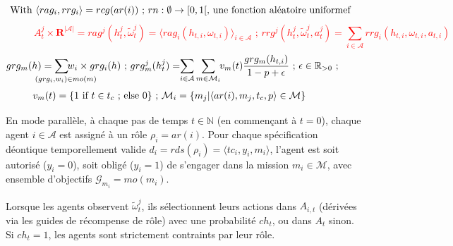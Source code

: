 \begin{figure}[h!]
\begin{scriptsize}
    \textcolor{red}{\[\hspace{-1cm}\text{ \hspace{-0.1cm} With } \langle rag_i, rrg_i \rangle = rcg(ar(i)) \text{ ; } rn: \emptyset \to [0,1[ \text{, une fonction aléatoire uniformef}\]}
    \vspace{-0.3cm}
    \textcolor{red}{\[A^j_t \times \mathbf{R}^{|\mathcal{A}|} = rag^j(h^j_t, \tilde{\omega}^j_t) = \langle rag_i(h_{t,i}, \omega_{t,i}) \rangle_{i \in \mathcal{A}} \text{ ; } rrg^j(h^j_t, \tilde{\omega}^j_t, a^j_t) = \sum_{i \in \mathcal{A}}{rrg_i(h_{t,i}, \omega_{t,i}, a_{t,i})}\]}
    \vspace{-0.75cm}
    \textcolor{blue}{
      \begin{gather*}
        \hspace{-1cm} grg_m(h) = \hspace{-1cm} \sum_{\hspace{0.3cm}(grg_i,w_i) \in mo(m)}{\hspace{-1.1cm} w_i \times grg_i(h)}
        \text{ ; }
        grg^j_m(h^j_t) = \hspace{-0.1cm} \sum_{i \in \mathcal{A}}{\sum_{m \in \mathcal{M}_i}{ \hspace{-0.1cm} v_m(t) \frac{grg_m(h_{t,i})}{1 - p + \epsilon} }} \text{ ; } \epsilon \in \mathbb{R}_{>0} \text{ ; }
      \end{gather*}
    }
    \vspace{-0.9cm}
    \textcolor{blue}{
      \begin{gather*}
        \hspace{-1cm}
        v_m(t) = \{ 1 \text{ if } t \in t_c \text{ ; else } 0 \} \text{ ; } \mathcal{M}_i = \{m_j | \langle ar(i),m_j,t_c,p \rangle \in \mathcal{M}\}
      \end{gather*}
    }
  \end{scriptsize}

\end{figure}

\noindent En mode parallèle, à chaque pas de temps $t \in \mathbb{N}$ (en commençant à $t=0$), chaque agent $i \in \mathcal{A}$ est assigné à un rôle $\rho_i = ar(i)$. Pour chaque spécification déontique temporellement valide $d_i = rds(\rho_i) = \langle tc_i, y_i, m_i \rangle$, l'agent est soit autorisé ($y_i = 0$), soit obligé ($y_i = 1$) de s'engager dans la mission $m_i \in \mathcal{M}$, avec ensemble d'objectifs $\mathcal{G}_{m_i} = mo(m_i)$.

Lorsque les agents observent $\tilde{\omega}_t^j$, ils sélectionnent leurs actions dans $A_{i,t}$ (dérivées via les guides de récompense de rôle) avec une probabilité $ch_t$, ou dans $A_t$ sinon. Si $ch_t = 1$, les agents sont strictement contraints par leur rôle.

